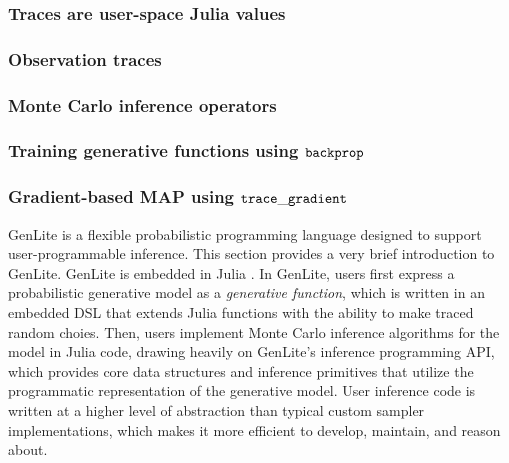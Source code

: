 \subsubsection{Traces are user-space Julia values}

\subsubsection{Observation traces}

\subsubsection{Monte Carlo inference operators}



\subsubsection{Training generative functions using $\mathtt{backprop}{}$} \label{sec:training}

\subsubsection{Gradient-based MAP using $\mathtt{trace\_gradient}{}$}

GenLite \cite{TODO} is a flexible probabilistic programming language designed to support user-programmable inference.
This section provides a very brief introduction to GenLite.
GenLite is embedded in Julia \cite{TODO}.
In GenLite, users first express a probabilistic generative model as a \emph{generative function}, which is written in an embedded DSL that extends Julia functions with the ability to make traced random choies.
Then, users implement Monte Carlo inference algorithms for the model in Julia code, drawing heavily on GenLite's inference programming API, which provides core data structures and inference primitives that utilize the programmatic representation of the generative model.
User inference code is written at a higher level of abstraction than typical custom sampler implementations, which makes it more efficient to develop, maintain, and reason about.

